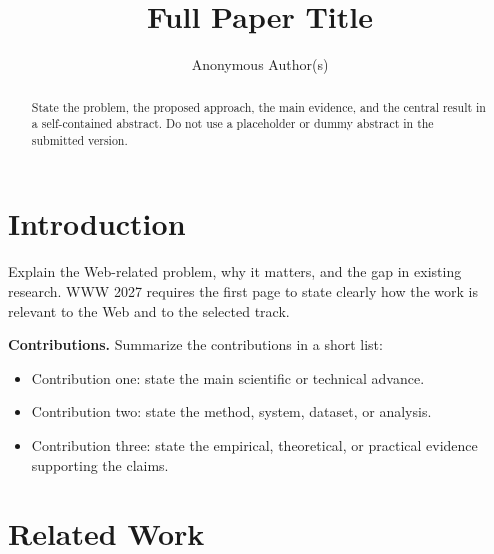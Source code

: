 \documentclass[sigconf,anonymous,review]{acmart}
\title[Short Paper Title]{Full Paper Title}
\author{Anonymous Author(s)}
\begin{document}
\begin{abstract}
State the problem, the proposed approach, the main evidence, and the central
result in a self-contained abstract. Do not use a placeholder or dummy
abstract in the submitted version.
\end{abstract}


\maketitle

\section{Introduction}
\label{sec:introduction}

Explain the Web-related problem, why it matters, and the gap in existing
research. WWW 2027 requires the first page to state clearly how the work is
relevant to the Web and to the selected track.

\textbf{Contributions.} Summarize the contributions in a short list:
\begin{itemize}
  \item Contribution one: state the main scientific or technical advance.
  \item Contribution two: state the method, system, dataset, or analysis.
  \item Contribution three: state the empirical, theoretical, or practical
        evidence supporting the claims.
\end{itemize}

\section{Related Work}
\label{sec:related-work}
\end{document}
